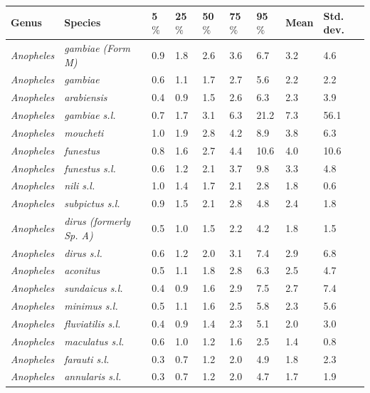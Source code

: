 \documentclass[12pt]{article}
\begin{document}
\begin{table}[htbp!]
	\begin{tabular}{l|l|l|l|l|l|l|l|l}
		\textbf{Genus} & \textbf{Species} & \textbf{5$\%$} & \textbf{25$\%$} & \textbf{50$\%$} &
		\textbf{75$\%$} & \textbf{95$\%$} & \textbf{Mean} & \textbf{Std. dev.} \\
		\hline
		\textit{Anopheles} & \textit{gambiae (Form M)} & 0.9 & 1.8 & 2.6 & 3.6 & 6.7 & 3.2 & 4.6 \\
		\textit{Anopheles} & \textit{gambiae} & 0.6 & 1.1 & 1.7 & 2.7 & 5.6 & 2.2 & 2.2 \\
		\textit{Anopheles} & \textit{arabiensis} & 0.4 & 0.9 & 1.5 & 2.6 & 6.3 & 2.3 & 3.9 \\
		\textit{Anopheles} & \textit{gambiae s.l.} & 0.7 & 1.7 & 3.1 & 6.3 & 21.2 & 7.3 & 56.1 \\
		\textit{Anopheles} & \textit{moucheti} & 1.0 & 1.9 & 2.8 & 4.2 & 8.9 & 3.8 & 6.3 \\
		\textit{Anopheles} & \textit{funestus} & 0.8 & 1.6 & 2.7 & 4.4 & 10.6 & 4.0 & 10.6 \\
		\textit{Anopheles} & \textit{funestus s.l.} & 0.6 & 1.2 & 2.1 & 3.7 & 9.8 & 3.3 & 4.8 \\
		\textit{Anopheles} & \textit{nili s.l.} & 1.0 & 1.4 & 1.7 & 2.1 & 2.8 & 1.8 & 0.6 \\
		\textit{Anopheles} & \textit{subpictus s.l.} & 0.9 & 1.5 & 2.1 & 2.8 & 4.8 & 2.4 & 1.8 \\
		\textit{Anopheles} & \textit{dirus (formerly Sp. A)} & 0.5 & 1.0 & 1.5 & 2.2 & 4.2 & 1.8 &
		1.5 \\
		\textit{Anopheles} & \textit{dirus s.l.} & 0.6 & 1.2 & 2.0 & 3.1 & 7.4 & 2.9 & 6.8 \\
		\textit{Anopheles} & \textit{aconitus} & 0.5 & 1.1 & 1.8 & 2.8 & 6.3 & 2.5 & 4.7 \\
		\textit{Anopheles} & \textit{sundaicus s.l.} & 0.4 & 0.9 & 1.6 & 2.9 & 7.5 & 2.7 & 7.4 \\
		\textit{Anopheles} & \textit{minimus s.l.} & 0.5 & 1.1 & 1.6 & 2.5 & 5.8 & 2.3 & 5.6 \\
		\textit{Anopheles} & \textit{fluviatilis s.l.} & 0.4 & 0.9 & 1.4 & 2.3 & 5.1 & 2.0 & 3.0 \\
		\textit{Anopheles} & \textit{maculatus s.l.} & 0.6 & 1.0 & 1.2 & 1.6 & 2.5 & 1.4 & 0.8 \\
		\textit{Anopheles} & \textit{farauti s.l.} & 0.3 & 0.7 & 1.2 & 2.0 & 4.9 & 1.8 & 2.3 \\
		\textit{Anopheles} & \textit{annularis s.l.} & 0.3 & 0.7 & 1.2 & 2.0 & 4.7 & 1.7 & 1.9 \\

\end{tabular}
\end{table}
\end{document}
